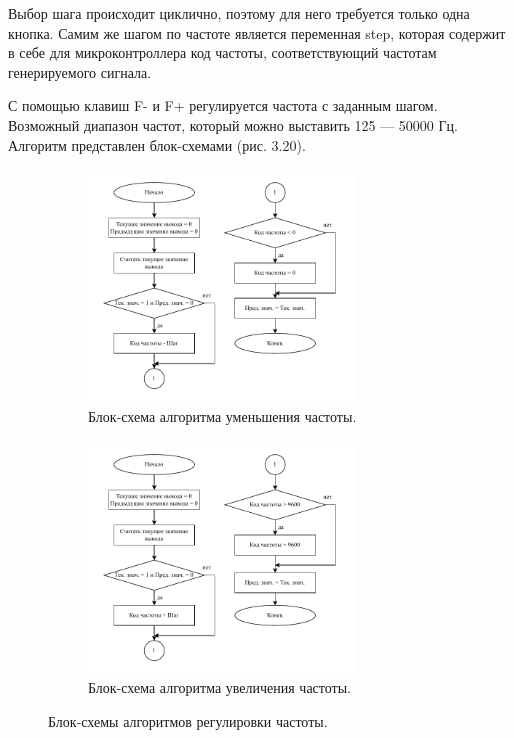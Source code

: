 	
	Выбор шага происходит циклично, поэтому для него требуется только одна кнопка. Самим же шагом по частоте является переменная step, которая содержит в себе для микроконтроллера код частоты, соответствующий частотам генерируемого сигнала.
	
	С помощью клавиш F- и F+ регулируется частота с заданным шагом. Возможный диапазон частот, который можно выставить 125 --- 50000 Гц. Алгоритм представлен блок-схемами (рис. 3.20).
	
	\begin{figure}[H]\captionsetup[subfigure]{font=normalsize}
     \begin{subfigure}[H]{1\textwidth}
         \centering
         \includegraphics[width=0.775\textwidth]{../image/minus_freq.pdf}
         \caption{Блок-схема алгоритма уменьшения частоты.}
     \end{subfigure}
     \hfill
     \begin{subfigure}[H]{1\textwidth}
         \centering
         \includegraphics[width=0.775\textwidth]{../image/plus_freq.pdf}
         \caption{Блок-схема алгоритма увеличения частоты.}
     \end{subfigure}
        \caption{Блок-схемы алгоритмов регулировки частоты.}
	\end{figure}
	
